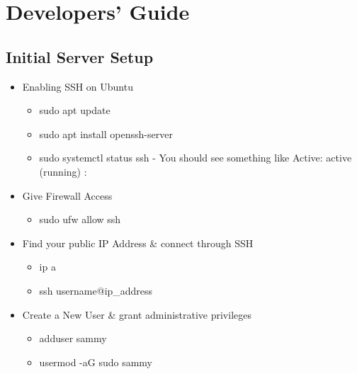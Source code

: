 \documentclass[10pt]{report}
\begin{document}
\chapter{Developers' Guide}
\section{Initial Server Setup}

\begin{itemize}

\item{Enabling SSH on Ubuntu}
\begin{itemize}
\item{sudo apt update}
\item{sudo apt install openssh-server}
\item{sudo systemctl status ssh - You should see something like Active: active (running) :}
\end{itemize}

\item{Give Firewall Access}
\begin{itemize}
\item{sudo ufw allow ssh}
\end{itemize}

\item{Find your public IP Address \& connect through SSH}
\begin{itemize}
\item{ip a}
\item{ssh username@ip\_address}
\end{itemize}

\item{Create a New User \& grant administrative privileges}
\begin{itemize}
\item{adduser sammy}
\item{usermod -aG sudo sammy}
\end{itemize}
\end{itemize}
\end{document}
